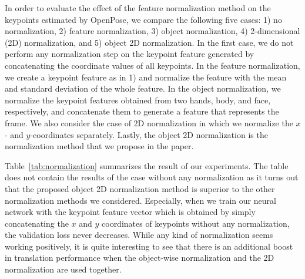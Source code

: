 \documentclass[10pt,twocolumn,letterpaper]{article}
\begin{document}
In order to evaluate the effect of the feature normalization method on the keypoints estimated by OpenPose, we compare the following five cases: 1) no normalization, 2) feature normalization, 3) object normalization, 4) 2-dimensional (2D) normalization, and 5) object 2D normalization. In the first case, we do not perform any normalization step on the keypoint feature generated by concatenating the coordinate values of all keypoints. In the feature normalization, we create a keypoint feature as in 1) and normalize the feature with the mean and standard deviation of the whole feature. In the object normalization, we normalize the keypoint features obtained from two hands, body, and face, respectively, and concatenate them to generate a feature that represents the frame. We also consider the case of 2D normalization in which we normalize the $x$- and $y$-coordinates separately.
Lastly, the object 2D normalization is the normalization method that we propose in the paper.

\begin{table}
\caption{Effect of different feature normalization methods on the translation performance. The results are obtained on the test set.}
\label{tab:normalization}
\end{table}

Table~\ref{tab:normalization} summarizes the result of our experiments.
The table does not contain the results of the case without any normalization as it turns out that the proposed object 2D normalization method is superior to the other normalization methods we considered. Especially, when we train our neural network with the keypoint feature vector which is obtained by simply concatenating the $x$ and $y$ coordinates of keypoints without any normalization, the validation loss never decreases. While any kind of normalization seems working positively, it is quite interesting to see that there is an additional boost in translation performance when the object-wise normalization and the 2D normalization are used together.
\\
\end{document}
